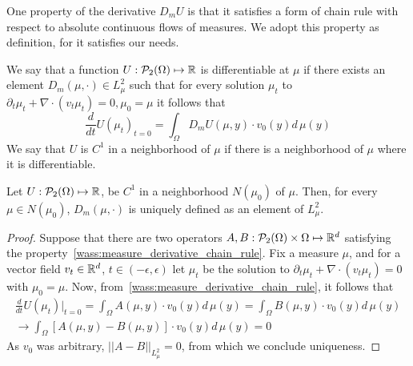 One property of the derivative $D_m U$ is that it satisfies a form of chain rule with respect to absolute continuous flows of measures. We adopt this property as definition, for it satisfies our needs.
\begin{definition}
We say that a function $U : \mathcal{P}_2(\Omega) \mapsto \mathbb{R}$ is differentiable at $\mu$ if there exists an element $D_m(\mu, \cdot) \in L^2_\mu$ such that for every solution $\mu_t$ to $\partial_t \mu_t + \nabla \cdot(v_t \mu_t) = 0, \mu_0 = \mu$ it follows that
\begin{equation}\label{wass:measure_derivative_chain_rule}
    \frac{d}{dt} U(\mu_t)_{t = 0} = \int_\Omega D_m U(\mu, y) \cdot v_0(y) d\, \mu(y)
\end{equation}
We say that $U$ is $C^1$ in a neighborhood of $\mu$ if there is a neighborhood of $\mu$ where it is differentiable.
\end{definition}

\begin{proposition}
    Let $U : \mathcal{P}_2(\Omega) \mapsto \mathbb{R}$,
    be $C^1$ in a neighborhood $N(\mu_0)$ of $\mu$.
    Then, for every $\mu \in N(\mu_0)$, $D_m(\mu,\cdot)$ is uniquely defined
    as an element of $L^2_\mu$.
\end{proposition}
\begin{proof}
    Suppose that there are two operators 
    $A, B: \mathcal{P}_2(\Omega) \times \Omega \mapsto \mathbb{R}^d$
    satisfying the property~\eqref{wass:measure_derivative_chain_rule}.
    Fix a measure $\mu$, and for a vector field 
    $v_t \in \mathbb{R}^d$, $t \in (-\epsilon, \epsilon)$
    let $\mu_t$ be the solution to $\partial_t \mu_t + \nabla \cdot(v_t \mu_t) = 0$
    with $\mu_0 = \mu$.
    Now, from~\eqref{wass:measure_derivative_chain_rule}, it follows that
    \begin{align*}
    \frac{d}{dt} U(\mu_t) |_{t = 0} = \int_\Omega A(\mu, y) \cdot v_0(y) d\, \mu(y) = \int_\Omega B(\mu, y) \cdot v_0(y) d\, \mu(y)\\
    \rightarrow \int_\Omega [A(\mu, y) - B(\mu, y)]  \cdot v_0(y) d\, \mu(y) = 0
    \end{align*}
    As $v_0$ was arbitrary, $||A - B||_{L^2_\mu} = 0$, from which we conclude 
    uniqueness.
\end{proof}
